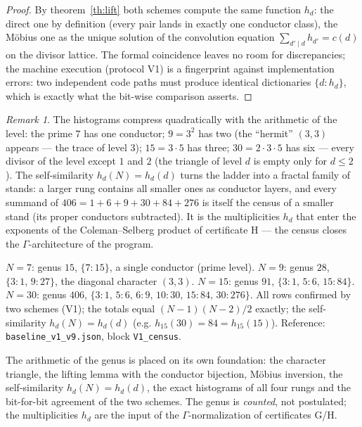 \documentclass[11pt,a4paper]{article}
\theoremstyle{plain}
\theoremstyle{definition}
\theoremstyle{remark}
\newtheorem{remark}[theorem]{Remark}
\newcommand{\Ga}{\Gamma}
\begin{document}
\begin{proof}
By theorem~\ref{th:lift} both schemes compute the same function
$h_d$: the direct one by definition (every pair lands in exactly
one conductor class), the M\"obius one as the unique solution of
the convolution equation $\sum_{d'\mid d}h_{d'}=c(d)$ on the
divisor lattice. The formal coincidence leaves no room for
discrepancies; the machine execution (protocol V1) is a
fingerprint against implementation errors: two independent code
paths must produce identical dictionaries $\{d\colon h_d\}$,
which is exactly what the bit-wise comparison asserts.
\end{proof}

\begin{remark}
The histograms compress quadratically with the arithmetic of the
level: the prime $7$ has one conductor; $9=3^2$ has two (the
``hermit'' $(3,3)$ appears --- the trace of level $3$);
$15=3\cdot5$ has three; $30=2\cdot3\cdot5$ has six --- every
divisor of the level except $1$ and $2$ (the triangle of level
$d$ is empty only for $d\le2$). The self-similarity
$h_d(N)=h_d(d)$ turns the ladder into a fractal family of
stands: a larger rung contains all smaller ones as
conductor layers, and every summand of
$406=1+6+9+30+84+276$ is itself the census of a smaller stand
(its proper conductors subtracted). It is the multiplicities
$h_d$ that enter the exponents of the Coleman--Selberg product of
certificate H --- the census closes the $\Ga$-architecture of the
program.
\end{remark}

\begin{databox}
$N=7$: genus $15$, $\{7\colon15\}$, a single conductor (prime
level). $N=9$: genus $28$, $\{3\colon1,\,9\colon27\}$, the
diagonal character $(3,3)$. $N=15$: genus $91$,
$\{3\colon1,\,5\colon6,\,15\colon84\}$. $N=30$: genus $406$,
$\{3\colon1,\,5\colon6,\,6\colon9,\,10\colon30,\,15\colon84,\,30\colon276\}$.
All rows confirmed by two schemes (V1); the totals equal
$(N-1)(N-2)/2$ exactly; the self-similarity $h_d(N)=h_d(d)$
(e.g. $h_{15}(30)=84=h_{15}(15)$). Reference:
\texttt{baseline\_v1\_v9.json}, block \texttt{V1\_census}.
\end{databox}

\begin{statusbox}[summary]
The arithmetic of the genus is placed on its own foundation: the
character triangle, the lifting lemma with the conductor
bijection, M\"obius inversion, the self-similarity
$h_d(N)=h_d(d)$, the exact histograms of all four rungs and the
bit-for-bit agreement of the two schemes. The genus is
\emph{counted}, not postulated; the multiplicities $h_d$ are the
input of the $\Ga$-normalization of certificates G/H.
\end{statusbox}
\end{document}
